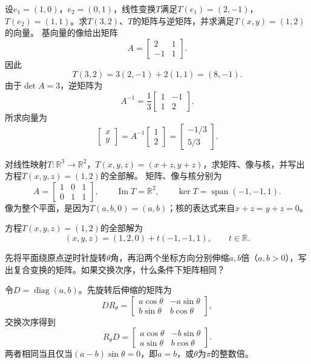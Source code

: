 设\(e_{1} = \left( 1 , 0 \right)\)，\(e_{2} = \left( 0 , 1 \right)\)，线性变换\(T\)满足\(T \left( e_{1} \right) = \left( 2 , - 1 \right)\)，\(T \left( e_{2} \right) = \left( 1 , 1 \right)\)。求\(T \left( 3 , 2 \right)\)、\(T\)的矩阵与逆矩阵，并求满足\(T \left( x , y \right) = \left( 1 , 2 \right)\)的向量。
\solutionanswer
基向量的像给出矩阵
\[
A=\begin{bmatrix}2&1\\-1&1\end{bmatrix}.
\]
因此
\[
T(3,2)=3(2,-1)+2(1,1)=(8,-1).
\]
由于\(\det A=3\)，逆矩阵为
\[
A^{-1}=\frac13\begin{bmatrix}1&-1\\1&2\end{bmatrix}.
\]
所求向量为
\[
\begin{bmatrix}x\\y\end{bmatrix}
=A^{-1}\begin{bmatrix}1\\2\end{bmatrix}
=\begin{bmatrix}-1/3\\5/3\end{bmatrix}.
\]


对线性映射\(T : \mathbb{R}^{3} \longrightarrow \mathbb{R}^{2}\)，\(T \left( x , y , z \right) = \left( x + z , y + z \right)\)，求矩阵、像与核，并写出方程\(T \left( x , y , z \right) = \left( 1 , 2 \right)\)的全部解。
\solutionanswer
矩阵、像与核分别为
\[
A=\begin{bmatrix}1&0&1\\0&1&1\end{bmatrix},\qquad
\operatorname{Im}T=\mathbb R^2,\qquad
\ker T=\operatorname{span}(-1,-1,1).
\]
像为整个平面，是因为\(T(a,b,0)=(a,b)\)；核的表达式来自\(x+z=y+z=0\)。

方程\(T(x,y,z)=(1,2)\)的全部解为
\[
(x,y,z)=(1,2,0)+t(-1,-1,1),\qquad t\in\mathbb R.
\]


先将平面绕原点逆时针旋转\(\theta\)角，再沿两个坐标方向分别伸缩\(a , b\)倍（\(a , b > 0\)），写出复合变换的矩阵。如果交换次序，什么条件下矩阵相同？
\par
\solutionanswer
令\(D=\operatorname{diag}(a,b)\)。先旋转后伸缩的矩阵为
\[
DR_\theta=
\begin{bmatrix}a\cos\theta&-a\sin\theta\\b\sin\theta&b\cos\theta\end{bmatrix},
\]
交换次序得到
\[
R_\theta D=
\begin{bmatrix}a\cos\theta&-b\sin\theta\\a\sin\theta&b\cos\theta\end{bmatrix}.
\]
两者相同当且仅当\((a-b)\sin\theta=0\)，即\(a=b\)，或\(\theta\)为\(\pi\)的整数倍。



